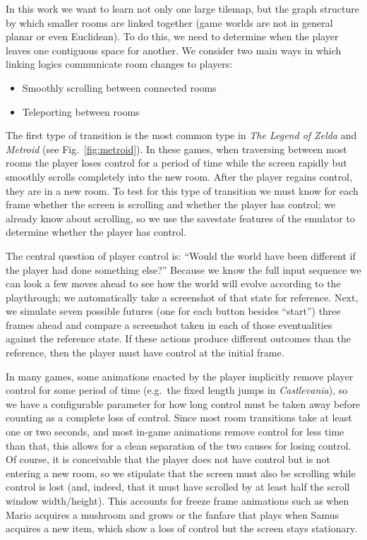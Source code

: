 \documentclass[a4paper]{article}
\begin{document}
In this work we want to learn not only one large tilemap, but the graph structure by which smaller rooms are linked together (game worlds are not in general planar or even Euclidean).
To do this, we need to determine when the player leaves one contiguous space for another.
We consider two main ways in which linking logics communicate room changes to players:
\begin{itemize}
\item Smoothly scrolling between connected rooms
\item Teleporting between rooms
\end{itemize}
The first type of transition is the most common type in \emph{The Legend of Zelda} and \emph{Metroid} (see Fig.~\ref{fig:metroid}).
In these games, when traversing between most rooms the player loses control for a period of time while the screen rapidly but smoothly scrolls completely into the new room.
After the player regains control, they are in a new room.
To test for this type of transition we must know for each frame whether the screen is scrolling and whether the player has control; we already know about scrolling, so we use the savestate features of the emulator to determine whether the player has control.

The central question of player control is: ``Would the world have been different if the player had done something else?''
Because we know the full input sequence we can look a few moves ahead to see how the world will evolve according to the playthrough; we automatically take a screenshot of that state for reference.
Next, we simulate seven possible futures (one for each button besides ``start'') three frames ahead and compare a screenshot taken in each of those eventualities against the reference state.
If these actions produce different outcomes than the reference, then the player must have control at the initial frame.

In many games, some animations enacted by the player implicitly remove player control for some period of time (e.g.\ the fixed length jumps in \emph{Castlevania}), so we have a configurable parameter for how long control must be taken away before counting as a complete loss of control.
Since most room transitions take at least one or two seconds, and most in-game animations remove control for less time than that, this allows for a clean separation of the two causes for losing control.
Of course, it is conceivable that the player does not have control but is not entering a new room, so we stipulate that the screen must also be scrolling while control is lost (and, indeed, that it must have scrolled by at least half the scroll window width/height).
This accounts for freeze frame animations such as when Mario acquires a mushroom and grows or the fanfare that plays when Samus acquires a new item, which show a loss of control but the screen stays stationary.
\end{document}
